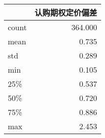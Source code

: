 \begin{tabular}{lr}
\toprule
{} &  认购期权定价偏差 \\
\midrule
count &   364.000 \\
mean  &     0.735 \\
std   &     0.289 \\
min   &     0.105 \\
25\%   &     0.537 \\
50\%   &     0.720 \\
75\%   &     0.886 \\
max   &     2.453 \\
\bottomrule
\end{tabular}
